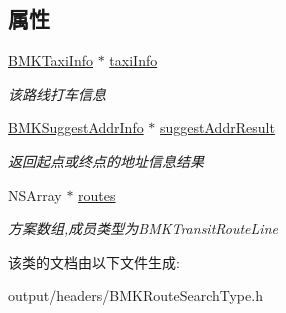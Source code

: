 \subsection*{属性}
\begin{DoxyCompactItemize}
\item 
\hypertarget{interface_b_m_k_transit_route_result_ae880202db7750ff403011f52fc3b87b7}{}\hyperlink{interface_b_m_k_taxi_info}{B\+M\+K\+Taxi\+Info} $\ast$ \hyperlink{interface_b_m_k_transit_route_result_ae880202db7750ff403011f52fc3b87b7}{taxi\+Info}\label{interface_b_m_k_transit_route_result_ae880202db7750ff403011f52fc3b87b7}

\begin{DoxyCompactList}\small\item\em 该路线打车信息 \end{DoxyCompactList}\item 
\hypertarget{interface_b_m_k_transit_route_result_ab5908f0b5471308dbd0ea14618c1b1d6}{}\hyperlink{interface_b_m_k_suggest_addr_info}{B\+M\+K\+Suggest\+Addr\+Info} $\ast$ \hyperlink{interface_b_m_k_transit_route_result_ab5908f0b5471308dbd0ea14618c1b1d6}{suggest\+Addr\+Result}\label{interface_b_m_k_transit_route_result_ab5908f0b5471308dbd0ea14618c1b1d6}

\begin{DoxyCompactList}\small\item\em 返回起点或终点的地址信息结果 \end{DoxyCompactList}\item 
\hypertarget{interface_b_m_k_transit_route_result_ad23c905161697d0549715622abd4b400}{}N\+S\+Array $\ast$ \hyperlink{interface_b_m_k_transit_route_result_ad23c905161697d0549715622abd4b400}{routes}\label{interface_b_m_k_transit_route_result_ad23c905161697d0549715622abd4b400}

\begin{DoxyCompactList}\small\item\em 方案数组,成员类型为\+B\+M\+K\+Transit\+Route\+Line \end{DoxyCompactList}\end{DoxyCompactItemize}


该类的文档由以下文件生成\+:\begin{DoxyCompactItemize}
\item 
output/headers/B\+M\+K\+Route\+Search\+Type.\+h\end{DoxyCompactItemize}
